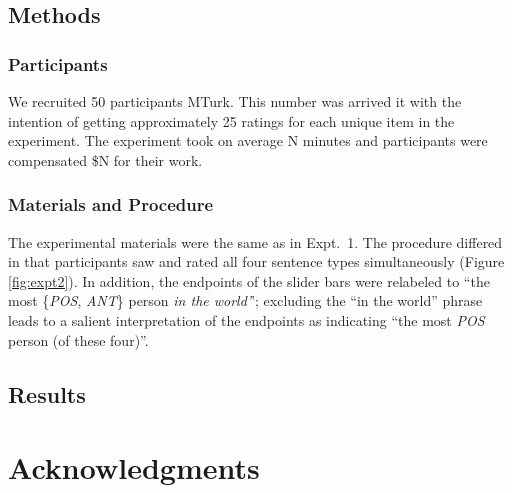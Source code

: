 \documentclass[10pt,letterpaper]{article}
\newcommand{\figref}[1]{Figure \ref{#1}}
\begin{document}
\subsection{Methods}

\subsubsection{Participants}

We recruited 50 participants MTurk.
This number was arrived it with the intention of getting approximately 25 ratings for each unique item in the experiment.
The experiment took on average N minutes and participants were compensated \$N for their work.


\subsubsection{Materials and Procedure}
The experimental materials were the same as in Expt.~1. 
The procedure differed in that participants saw and rated all four sentence types simultaneously (\figref{fig:expt2}). 
In addition, the endpoints of the slider bars were relabeled to ``the most \{\emph{POS}, \emph{ANT}\} person \emph{in the world'}'; excluding the ``in the world'' phrase leads to a salient interpretation of the endpoints as indicating ``the most \emph{POS} person (of these four)''.

\subsection{Results}


\section{Acknowledgments}




\setlength{\bibleftmargin}{.125in}
\setlength{\bibindent}{-\bibleftmargin}


\end{document}
